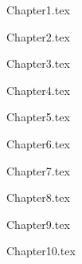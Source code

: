 \documentclass[a4paper, 11pt, oneside]{Thesis}  %
\begin{document}
	
	\pagestyle{empty}  %
	
	
	
	\mainmatter	  %
	\pagestyle{fancy}  %
	
	
	\lhead{\emph{\chapiname}}
	{Chapter1.tex} %
	
	\lhead{\emph{\chapiiname}}
	{Chapter2.tex} %
	
	\lhead{\emph{\chapiiiname}}
	{Chapter3.tex} %
	
	\lhead{\emph{\chapivname}}
	{Chapter4.tex} %
	
	\lhead{\emph{\chapvname}}
	{Chapter5.tex} %
	
	\lhead{\emph{\chapviname}}
	{Chapter6.tex} %
	
	\lhead{\emph{\chapviiname}}
	{Chapter7.tex} %
	
	\lhead{\emph{\chapviiiname}}
	{Chapter8.tex} %
	
	\lhead{\emph{\chapixname}}
	{Chapter9.tex} %
	
	\lhead{\emph{\chapxname}}
	{Chapter10.tex} %
	
	
	
	\appendix %
	
	
	
	
	\backmatter
	
	\label{Bibliography}
	
\end{document}
